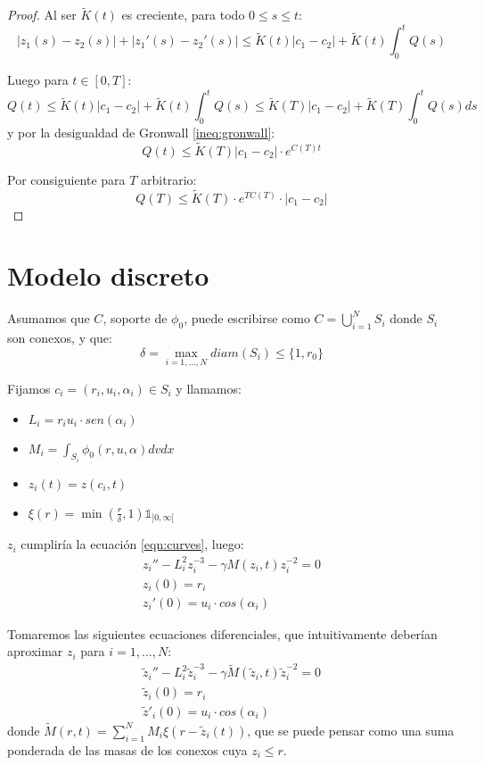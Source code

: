 \documentclass[a4paper,10pt]{scrartcl}
\theoremstyle{definition}
\numberwithin{equation}{section}
\begin{document}
\begin{proof}
 Al ser $\widetilde{K}(t)$ es creciente, para todo $0 \le s \le t$:
 \[
    |z_1(s) - z_2(s)| + |z_1'(s) - z_2'(s)|  \le \widetilde{K}(t)|c_1 - c_2| + \widetilde{K}(t) \int_0^t Q(s)
 \]

 Luego para $t\in [0,T]$:
 \[
  Q(t) \le \widetilde{K}(t)|c_1 - c_2| + \widetilde{K}(t) \int_0^t Q(s) \le \widetilde{K}(T)|c_1 - c_2| + \widetilde{K}(T) \int_0^t Q(s)ds
 \]
 y por la desigualdad de Gronwall \ref{ineq:gronwall}:
 \[
  Q(t) \le \widetilde{K}(T)|c_1 - c_2| \cdot e^{C(T)t}
 \]
 
 Por consiguiente para $T$ arbitrario:
 \[
  Q(T) \le \widetilde{K}(T)\cdot e^{TC(T)} \cdot |c_1 - c_2|
 \]
 
\end{proof}

\newpage
\section{Modelo discreto}
Asumamos que $C$, soporte de $\phi_0$, puede escribirse como $C= \bigcup_{i=1}^N S_i$ donde $S_i$ son conexos, y que:
\[
    \delta = \max_{i=1,\ldots, N} diam(S_i) \le \{1,r_0\}
\]

Fijamos $c_i = (r_i, u_i, \alpha_i) \in S_i$ y llamamos:
\begin{itemize}
\item $L_i = r_i u_i \cdot sen(\alpha_i)$
\item $M_i = \int_{S_i} \phi_0(r,u,\alpha) dv dx$
\item $z_i(t) = z(c_i,t)$
\item $\xi(r) = \min\left(\frac{r}{\delta},1\right) \mathds{1}_{]0,\infty[}$
\end{itemize}

$z_i$ cumpliría la ecuación \eqref{eqn:curves}, luego:
\begin{align*}
 z_i'' - L_i^2 z_i^{-3} - \gamma M(z_i, t) z_i^{-2} = 0\\
 z_i(0) = r_i\\
 z_i'(0) = u_i \cdot cos(\alpha_i)
\end{align*}

Tomaremos las siguientes ecuaciones diferenciales, que intuitivamente deberían aproximar $z_i$ para $i=1, \ldots, N$:
\begin{align}
 \label{eqn:approx-curves}
 \widetilde{z}_i'' - L_i^{2} \widetilde{z}_i^{-3} - \gamma \widetilde{M}(\widetilde{z}_i, t) \widetilde{z}_i^{-2} = 0 \nonumber\\
 \widetilde{z}_i(0) = r_i \nonumber\\
 \widetilde{z}'_i(0) = u_i \cdot cos(\alpha_i)
\end{align}
donde $\widetilde{M}(r,t) = \sum_{i=1}^N M_i \xi(r-\widetilde{z}_i(t))$, que se puede pensar como una suma ponderada de las masas de los conexos cuya $z_i \le r$.
\end{document}
